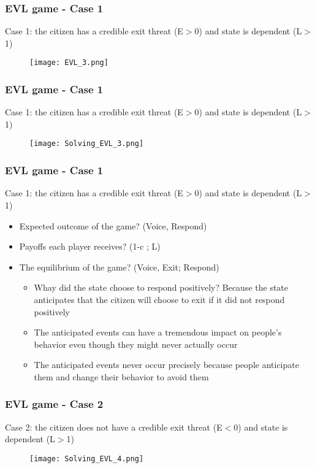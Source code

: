 \documentclass[xcolor=pdftex,dvipsnames]{beamer}
\begin{document}
\begin{frame}
\frametitle{EVL game - Case 1}
Case 1: the citizen has a credible exit threat (E$>$0) and state is dependent (L$>$1)
\begin{figure}
\begin{center}
  \texttt{[image: EVL\_3.png]}\\
\end{center}
\end{figure}
\end{frame}

\begin{frame}
\frametitle{EVL game - Case 1}
Case 1: the citizen has a credible exit threat (E$>$0) and state is dependent (L$>$1)
\begin{figure}
\begin{center}
  \texttt{[image: Solving\_EVL\_3.png]}\\
\end{center}
\end{figure}
\end{frame}

\begin{frame}
\frametitle{EVL game - Case 1}
Case 1: the citizen has a credible exit threat (E$>$0) and state is dependent (L$>$1)
\begin{itemize}
\item Expected outcome of the game? (Voice, Respond)
\item Payoffs each player receives? (1-c ; L)
\item The equilibrium of the game? (Voice, Exit; Respond)
\begin{itemize}
\item Whay did the state choose to respond positively? Because the state anticipates that the citizen will choose to exit if it did not respond positively
\item The anticipated events can have a tremendous impact on people's behavior even though they might never actually occur
\item The anticipated events never occur precisely because people anticipate them and change their behavior to avoid them
\end{itemize}
\end{itemize}
\end{frame}


\begin{frame}
\frametitle{EVL game - Case 2}
Case 2: the citizen does not have a credible exit threat (E$<$0) and state is dependent (L$>$1)
\begin{figure}
\begin{center}
  \texttt{[image: Solving\_EVL\_4.png]}\\
\end{center}
\end{figure}
\end{frame}
\end{document}
